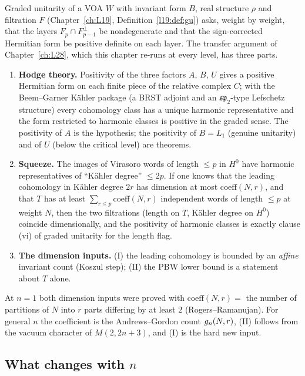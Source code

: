 Graded unitarity of a VOA $W$ with invariant form $B$, real structure $\rho$ and filtration $F$
(Chapter~\ref{ch:L19}, Definition~\ref{l19:def:gu}) asks, weight by weight, that the layers
$F_p\cap F_{p-1}^\perp$ be nondegenerate and that the sign-corrected Hermitian form be positive definite on each
layer. The transfer argument of Chapter~\ref{ch:L28}, which this chapter re-runs at every level, has three parts.
\begin{enumerate}
\item \textbf{Hodge theory.} Positivity of the three factors $A$, $B$, $U$ gives a positive Hermitian form on each
  finite piece of the relative complex $C$; with the Beem--Garner Kähler package (a BRST adjoint and an
  $\mathfrak{sp}_2$-type Lefschetz structure) every cohomology class has a unique harmonic representative and the
  form restricted to harmonic classes is positive in the graded sense. The positivity of $A$ is the hypothesis; the
  positivity of $B=L_1$ (genuine unitarity) and of $U$ (below the critical level) are theorems.
\item \textbf{Squeeze.} The images of Virasoro words of length $\le p$ in $H^0$ have harmonic representatives of
  ``Kähler degree'' $\le 2p$. If one knows that the leading cohomology in Kähler degree $2r$ has dimension at most
  $\mathrm{coeff}(N,r)$, and that $T$ has at least $\sum_{r\le p}\mathrm{coeff}(N,r)$ independent words of length
  $\le p$ at weight $N$, then the two filtrations (length on $T$, Kähler degree on $H^0$) coincide dimensionally,
  and the positivity of harmonic classes is exactly clause (vi) of graded unitarity for the length flag.
\item \textbf{The dimension inputs.} (I) the leading cohomology is bounded by an \emph{affine} invariant count
  (Koszul step); (II) the PBW lower bound is a statement about $T$ alone.
\end{enumerate}
At $n=1$ both dimension inputs were proved with $\mathrm{coeff}(N,r)=$ the number of partitions of $N$ into $r$
parts differing by at least $2$ (Rogers--Ramanujan). For general $n$ the coefficient is the Andrews--Gordon count
$g_n(N,r)$, (II) follows from the vacuum character of $M(2,2n+3)$, and (I) is the hard new input.

\subsection{What changes with \texorpdfstring{$n$}{n}}\label{l29:sec:whatchanges}

